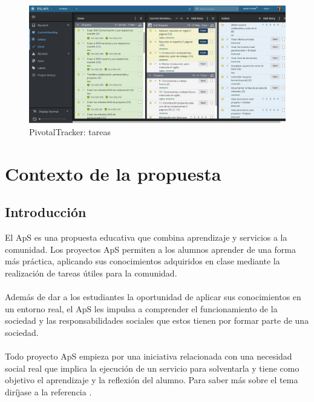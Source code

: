 \documentclass[11pt]{book}
\begin{document}
	\begin{figure}[t]
		\centering
		\includegraphics[scale=0.44]{pivotal2}
		\caption{PivotalTracker: tareas}
		\label{fig:pivotal2}
	\end{figure}
	\chapter{Contexto de la propuesta}\label{cap:contexto}
	\section{Introducción}
	El ApS es una propuesta educativa que combina aprendizaje y servicios a la comunidad. Los proyectos ApS permiten a los alumnos aprender de una forma más práctica, aplicando sus conocimientos adquiridos en clase mediante la realización de tareas útiles para la comunidad. \\\\
	Además de dar a los estudiantes la oportunidad de aplicar sus conocimientos en un entorno real, el ApS les impulsa a comprender el funcionamiento de la sociedad y las responsabilidades sociales que estos tienen por formar parte de una sociedad.\\\\
	Todo proyecto ApS empieza por una iniciativa relacionada con una necesidad social real que implica la ejecución de un servicio para solventarla y tiene como objetivo el aprendizaje y la reflexión del alumno. Para saber más sobre el tema diríjase a la referencia \cite{rego2015aprendizaje}.
\end{document}
